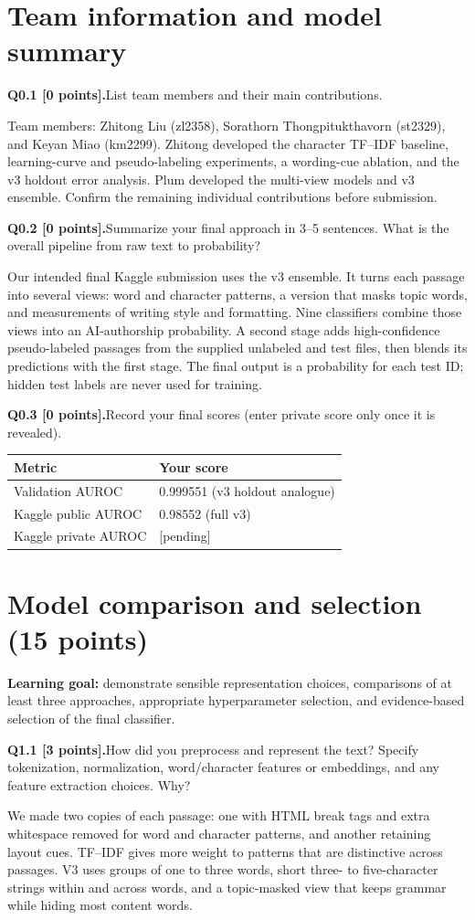 \documentclass[11pt,letterpaper]{article}
\newcommand{\question}[2]{\needspace{4\baselineskip}\par\addvspace{0.45em}\noindent\textbf{#1}\quad #2\par\nobreak\vspace{0.1em}}
\begin{document}
\section{Team information and model summary}
\question{Q0.1 [0 points].}{List team members and their main contributions.}
Team members: Zhitong Liu (zl2358), Sorathorn Thongpitukthavorn (st2329), and Keyan Miao (km2299). Zhitong developed the character TF--IDF baseline, learning-curve and pseudo-labeling experiments, a wording-cue ablation, and the v3 holdout error analysis. Plum developed the multi-view models and v3 ensemble. Confirm the remaining individual contributions before submission.
\question{Q0.2 [0 points].}{Summarize your final approach in 3--5 sentences. What is the overall pipeline from raw text to probability?}
Our intended final Kaggle submission uses the v3 ensemble. It turns each passage into several views: word and character patterns, a version that masks topic words, and measurements of writing style and formatting. Nine classifiers combine those views into an AI-authorship probability. A second stage adds high-confidence pseudo-labeled passages from the supplied unlabeled and test files, then blends its predictions with the first stage. The final output is a probability for each test ID; hidden test labels are never used for training.
\question{Q0.3 [0 points].}{Record your final scores (enter private score only once it is revealed).}
\begin{tabularx}{\linewidth}{@{}Yp{1.8in}@{}}\toprule Metric & Your score \\ \midrule Validation AUROC & 0.999551 (v3 holdout analogue) \\ Kaggle public AUROC & 0.98552 (full v3) \\ Kaggle private AUROC & [pending] \\ \bottomrule\end{tabularx}
\newpage
\section{Model comparison and selection (15 points)}
\textbf{Learning goal:} demonstrate sensible representation choices, comparisons of at least three approaches, appropriate hyperparameter selection, and evidence-based selection of the final classifier.

\question{Q1.1 [3 points].}{How did you preprocess and represent the text? Specify tokenization, normalization, word/character features or embeddings, and any feature extraction choices. Why?}
We made two copies of each passage: one with HTML break tags and extra whitespace removed for word and character patterns, and another retaining layout cues. TF--IDF gives more weight to patterns that are distinctive across passages. V3 uses groups of one to three words, short three- to five-character strings within and across words, and a topic-masked view that keeps grammar while hiding most content words.
\newline
\end{document}

